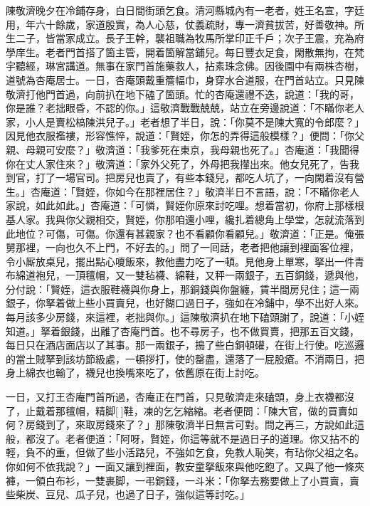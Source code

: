 陳敬濟晚夕在冷鋪存身，白日間街頭乞食。清河縣城內有一老者，姓王名宣，字廷用，年六十餘歲，家道殷實，為人心慈，仗義疏財，專一濟貧拔苦，好善敬神。所生二子，皆當家成立。長子王幹，襲祖職為牧馬所掌印正千戶；次子王震，充為府學庠生。老者門首搭了箇主管，開着箇解當鋪兒。每日豐衣足食，閑散無拘，在梵宇聽經，琳宮講道。無事在家門首施藥救人，拈素珠念佛。因後園中有兩株杏樹，道號為杏庵居士。一日，杏庵頭戴重簷幅巾，身穿水合道服，在門首站立。只見陳敬濟打他門首過，向前扒在地下磕了箇頭。忙的杏庵還禮不迭，說道：「我的哥，你是誰？老拙眼昏，不認的你。」這敬濟戰戰兢兢，站立在旁邊說道：「不瞞你老人家，小人是賣松槁陳洪兒子。」老者想了半日，說：「你莫不是陳大寬的令郎麼？」{}因見他衣服襤褸，形容憔悴，說道：「賢姪，你怎的弄得這般模樣？」便問：「你父親、母親可安麼？」敬濟道：「我爹死在東京，我母親也死了。」杏庵道：「我聞得你在丈人家住來？」敬濟道：「家外父死了，外母把我攆出來。他女兒死了，告我到官，打了一場官司。把房兒也賣了，有些本錢兒，都吃人坑了，一向閑着沒有營生。」杏庵道：「賢姪，你如今在那裡居住？」敬濟半日不言語，說：「不瞞你老人家說，如此如此。」{}杏庵道：「可憐，賢姪你原來討吃哩。想着當初，你府上那樣根基人家。我與你父親相交，賢姪，你那咱還小哩，纔扎着總角上學堂，怎就流落到此地位？可傷，可傷。你還有甚親家？也不看顧你看顧兒。」敬濟道：「正是。俺張舅那裡，一向也久不上門，不好去的。」問了一囘話，老者把他讓到裡面客位裡，令小厮放桌兒，擺出點心嗄飯來，教他盡力吃了一頓。見他身上單寒，拏出一件青布綿道袍兒，一頂氊帽，又一雙毡襪、綿鞋，又秤一兩銀子，五百銅錢，遞與他，分付說：「賢姪，這衣服鞋襪與你身上，那銅錢與你盤纏，賃半間房兒住；這一兩銀子，你拏着做上些小買賣兒，也好餬口過日子，強如在冷鋪中，學不出好人來。{}每月該多少房錢，來這裡，老拙與你。」這陳敬濟扒在地下磕頭謝了，說道：「小姪知道。」拏着銀錢，出離了杏庵門首。也不尋房子，也不做買賣，把那五百文錢，每日只在酒店面店以了其事。{}那一兩銀子，搗了些白銅頓礶，在街上行使。{}吃巡邏的當土賊拏到該坊節級處，一頓拶打，使的罄盡，還落了一屁股瘡。不消兩日，把身上綿衣也輸了，襪兒也換嘴來吃了，依舊原在街上討吃。

一日，又打王杏庵門首所過，杏庵正在門首，只見敬濟走來磕頭，身上衣襪都沒了，止戴着那氊帽，精脚[]鞋，凍的乞乞縮縮。老者便問：「陳大官，做的買賣如何？房錢到了，來取房錢來了？」那陳敬濟半日無言可對。問之再三，方說如此這般，都沒了。老者便道：「阿呀，賢姪，你這等就不是過日子的道理。你又拈不的輕，負不的重，但做了些小活路兒，不強如乞食，免教人恥笑，有玷你父祖之名。你如何不依我說？」一面又讓到裡面，教安童拏飯來與他吃飽了。又與了他一條夾褲，一領白布衫，一雙裹脚，一弔銅錢，一斗米：「你拏去務要做上了小買賣，賣些柴炭、豆兒、瓜子兒，也過了日子，強似這等討吃。」


